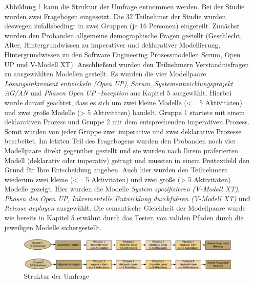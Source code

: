 Abbildung \ref{fig:UmfrageStruktur} kann die Struktur der Umfrage entnommen werden.
Bei der Studie wurden zwei Fragebögen eingesetzt. Die 32 Teilnehmer der Studie wurden deswegen zufallsbedingt in zwei Gruppen (je 16 Personen) eingeteilt. Zunächst wurden den Probanden allgemeine demographische Fragen gestellt (Geschlecht, Alter, Hintergrundwissen zu imperativer und deklarativer Modellierung, Hintergrundwissen zu den Software Engineering Prozessmodellen Scrum, Open UP und V-Modell XT).\newline
Anschließend wurden den Teilnehmern Verständnisfragen zu ausgewählten Modellen gestellt.
Es wurden die vier  Modellpaare \textit{Lösungsinkrement entwickeln (Open UP)}, \textit{Scrum}, \textit{Systementwicklungsprojekt AG/AN} und \textit{Phasen Open UP -Inception}  aus Kapitel 5 ausgewählt. Hierbei wurde darauf geachtet, dass es sich um zwei kleine Modelle (<= 5 Aktivitäten) und zwei große Modelle (> 5 Aktivitäten) handelt. Gruppe 1 startete mit einem deklarativen Prozess und Gruppe 2 mit dem entsprechenden imperativen Prozess. Somit wurden von jeder Gruppe zwei imperative und zwei deklarative Prozesse bearbeitet.  \newline
Im letzten Teil des Fragebogens wurden den Probanden noch vier Modellpaare direkt gegenüber gestellt und sie wurden nach Ihrem präferierten Modell (deklarativ oder imperativ) gefragt und mussten in einem Freitextfeld den Grund für Ihre Entscheidung angeben. Auch hier wurden den Teilnehmern wiederum zwei kleine (<= 5 Aktivitäten) und zwei große (> 5 Aktivitäten)  Modelle gezeigt. Hier wurden die Modelle \textit{System spezifizieren (V-Modell XT)}, \textit{Phasen des Open UP}, \textit{Inkrementelle Entwicklung durchführen (V-Modell XT)} und \textit{Release deployen} ausgewählt. \newline
Die semantische Gleichheit der Modellpaare wurde wie bereits in Kapitel 5 erwähnt durch das Testen von validen Pfaden durch die jeweiligen Modelle sichergestellt.\newline

\begin{figure}[H]
\begin{center}
  \includegraphics [width=\textwidth]{UmfrageStruktur} %
  \caption{Struktur der Umfrage}
  \label{fig:UmfrageStruktur}
\end{center}
\end{figure}


